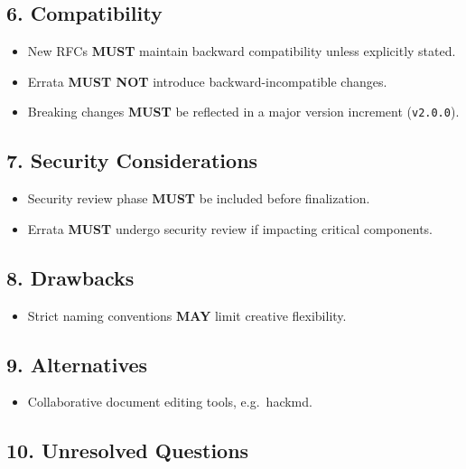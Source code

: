 \subsection{6. Compatibility}\label{compatibility}

\begin{itemize}
\tightlist
\item
  New RFCs \textbf{MUST} maintain backward compatibility unless
  explicitly stated.
\item
  Errata \textbf{MUST NOT} introduce backward-incompatible changes.
\item
  Breaking changes \textbf{MUST} be reflected in a major version
  increment (\texttt{v2.0.0}).
\end{itemize}

\subsection{7. Security Considerations}\label{security-considerations}

\begin{itemize}
\tightlist
\item
  Security review phase \textbf{MUST} be included before finalization.
\item
  Errata \textbf{MUST} undergo security review if impacting critical
  components.
\end{itemize}

\subsection{8. Drawbacks}\label{drawbacks}

\begin{itemize}
\tightlist
\item
  Strict naming conventions \textbf{MAY} limit creative flexibility.
\end{itemize}

\subsection{9. Alternatives}\label{alternatives}

\begin{itemize}
\tightlist
\item
  Collaborative document editing tools, e.g.~hackmd.
\end{itemize}

\subsection{10. Unresolved Questions}\label{unresolved-questions}

